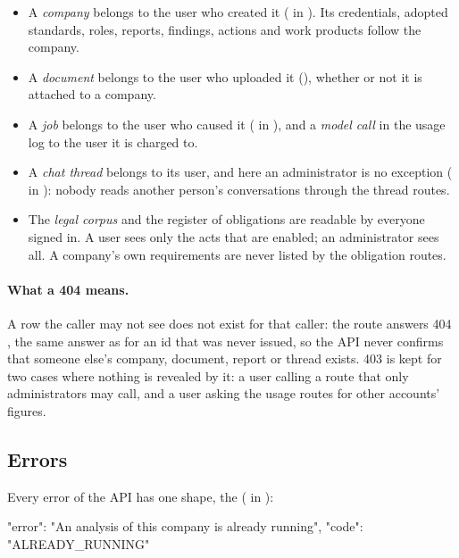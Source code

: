 \begin{itemize}
  \item A \emph{company} belongs to the user who created it ( in
    ). Its credentials, adopted standards, roles, reports,
    findings, actions and work products follow the company.
  \item A \emph{document} belongs to the user who uploaded it (),
    whether or not it is attached to a company.
  \item A \emph{job} belongs to the user who caused it ( in
    ), and a \emph{model call} in the usage log to the user it is
    charged to.
  \item A \emph{chat thread} belongs to its user, and here an administrator is no exception
    ( in ): nobody reads another person's
    conversations through the thread routes.
  \item The \emph{legal corpus} and the register of obligations are readable by everyone
    signed in. A user sees only the acts that are enabled; an administrator sees all. A
    company's own requirements are never listed by the obligation routes.
\end{itemize}

\paragraph{What a 404 means.} A row the caller may not see does not exist for that caller: the
route answers 404 , the same answer as for an id that was never issued, so the
API never confirms that someone else's company, document, report or thread exists. 403 is kept
for two cases where nothing is revealed by it: a user calling a route that only administrators
may call, and a user asking the usage routes for other accounts' figures.

\subsection{Errors}\label{sec:api:errors}

Every error of the API has one shape, the  ( in
):

\begin{codeblock}
{"error": "An analysis of this company is already running", "code": "ALREADY_RUNNING"}
\end{codeblock}

